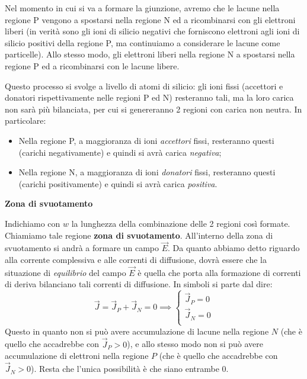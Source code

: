 \documentclass[a4paper,11pt]{article}
\begin{document}
Nel momento in cui si va a formare la giunzione, avremo che le lacune nella regione P vengono a spostarsi nella regione N ed a ricombinarsi con gli elettroni liberi (in verità sono gli ioni di silicio negativi che forniscono elettroni agli ioni di silicio positivi della regione P, ma continuiamo a considerare le lacune come particelle). Allo stesso modo, gli elettroni liberi nella regione N a spostarsi nella regione P ed a ricombinarsi con le lacune libere. 

Questo processo si svolge a livello di atomi di silicio: gli ioni fissi (accettori e donatori rispettivamente nelle regioni P ed N) resteranno tali, ma la loro carica non sarà più bilanciata, per cui si genereranno 2 regioni con carica non neutra. In particolare:
\begin{itemize}
	\item Nella regione P, a maggioranza di ioni \textit{accettori} fissi, resteranno questi (carichi negativamente) e quindi si avrà carica \textit{negativa};
	\item Nella regione N, a maggioranza di ioni \textit{donatori} fissi, resteranno questi (carichi positivamente) e quindi si avrà carica \textit{positiva}.
\end{itemize}

\par\smallskip

\noindent
\textbf{\textsf{Zona di svuotamento}}

\noindent
Indichiamo con $w$ la lunghezza della combinazione delle 2 regioni così formate. Chiamiamo tale regione \textbf{zona di svuotamento}. All'interno della zona di svuotamento si andrà a formare un campo $\vec{E}$. Da quanto abbiamo detto riguardo alla corrente complessiva e alle correnti di diffusione, dovrà essere che la situazione di \textit{equilibrio} del campo $\vec{E}$ è quella che porta alla formazione di correnti di deriva bilanciano tali correnti di diffusione. In simboli si parte dal dire:
$$
\vec{J} = \vec{J}_P + \vec{J}_N = 0 \implies
\begin{cases}
	\vec{J}_P = 0 \\
	\vec{J}_N = 0 \\
\end{cases}
$$
Questo in quanto non si può avere accumulazione di lacune nella regione $N$ (che è quello che accadrebbe con $\vec{J}_P > 0$), e allo stesso modo non si può avere accumulazione di elettroni nella regione $P$ (che è quello che accadrebbe con $\vec{J}_N > 0$). Resta che l'unica possibilità è che siano entrambe 0.
\end{document}
